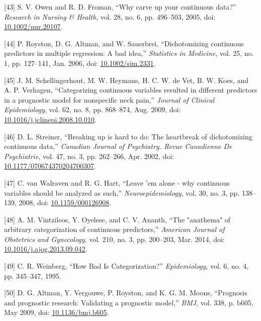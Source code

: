 \documentclass[12pt,twoside]{reedthesis}
\newenvironment{cslreferences}%
  {}%
  {\par}
\begin{document}
\begin{cslreferences}
\leavevmode\hypertarget{ref-owen_why_2005}{}%
{[}43{]} S. V. Owen and R. D. Froman, ``Why carve up your continuous data?'' \emph{Research in Nursing \& Health}, vol. 28, no. 6, pp. 496--503, 2005, doi: \href{https://doi.org/10.1002/nur.20107}{10.1002/nur.20107}.

\leavevmode\hypertarget{ref-royston_dichotomizing_2006}{}%
{[}44{]} P. Royston, D. G. Altman, and W. Sauerbrei, ``Dichotomizing continuous predictors in multiple regression: A bad idea,'' \emph{Statistics in Medicine}, vol. 25, no. 1, pp. 127--141, Jan. 2006, doi: \href{https://doi.org/10.1002/sim.2331}{10.1002/sim.2331}.

\leavevmode\hypertarget{ref-schellingerhout_categorizing_2009}{}%
{[}45{]} J. M. Schellingerhout, M. W. Heymans, H. C. W. de Vet, B. W. Koes, and A. P. Verhagen, ``Categorizing continuous variables resulted in different predictors in a prognostic model for nonspecific neck pain,'' \emph{Journal of Clinical Epidemiology}, vol. 62, no. 8, pp. 868--874, Aug. 2009, doi: \href{https://doi.org/10.1016/j.jclinepi.2008.10.010}{10.1016/j.jclinepi.2008.10.010}.

\leavevmode\hypertarget{ref-streiner_breaking_2002}{}%
{[}46{]} D. L. Streiner, ``Breaking up is hard to do: The heartbreak of dichotomizing continuous data,'' \emph{Canadian Journal of Psychiatry. Revue Canadienne De Psychiatrie}, vol. 47, no. 3, pp. 262--266, Apr. 2002, doi: \href{https://doi.org/10.1177/070674370204700307}{10.1177/070674370204700307}.

\leavevmode\hypertarget{ref-van_walraven_leave_2008}{}%
{[}47{]} C. van Walraven and R. G. Hart, ``Leave 'em alone - why continuous variables should be analyzed as such,'' \emph{Neuroepidemiology}, vol. 30, no. 3, pp. 138--139, 2008, doi: \href{https://doi.org/10.1159/000126908}{10.1159/000126908}.

\leavevmode\hypertarget{ref-vintzileos_anathema_2014}{}%
{[}48{]} A. M. Vintzileos, Y. Oyelese, and C. V. Ananth, ``The "anathema" of arbitrary categorization of continuous predictors,'' \emph{American Journal of Obstetrics and Gynecology}, vol. 210, no. 3, pp. 200--203, Mar. 2014, doi: \href{https://doi.org/10.1016/j.ajog.2013.09.042}{10.1016/j.ajog.2013.09.042}.

\leavevmode\hypertarget{ref-weinberg_how_1995}{}%
{[}49{]} C. R. Weinberg, ``How Bad Is Categorization?'' \emph{Epidemiology}, vol. 6, no. 4, pp. 345--347, 1995.

\leavevmode\hypertarget{ref-altman_prognosis_2009}{}%
{[}50{]} D. G. Altman, Y. Vergouwe, P. Royston, and K. G. M. Moons, ``Prognosis and prognostic research: Validating a prognostic model,'' \emph{BMJ}, vol. 338, p. b605, May 2009, doi: \href{https://doi.org/10.1136/bmj.b605}{10.1136/bmj.b605}.


\end{cslreferences}
\end{document}
